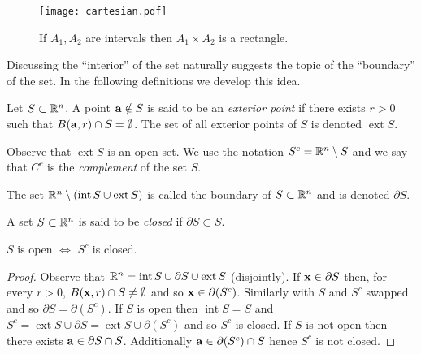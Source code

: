 \begin{figure}[htb]
    \begin{centering}
        \texttt{[image: cartesian.pdf]}
        \caption{If \(A_1, A_2\) are intervals then \( A_1 \times A_2 \) is a rectangle.}
    \end{centering}
\end{figure}

Discussing the ``interior'' of the set naturally suggests the topic of the ``boundary'' of the set.
In the following definitions we develop this idea.


\begin{definition}
    Let \(S\subset \bR^n\).
    A point \(\aa \notin S\) is said to be an \emph{exterior point} if there exists \(r>0\) such that \(B(\aa,r)\cap S = \emptyset\).
    The set of all exterior points of \(S\) is denoted \(\operatorname{ext} S\).
\end{definition}

Observe that \(\operatorname{ext} S\) is an open set.
We use the notation \(S^c = \bR^n \setminus S\) and we say that \(C^c\) is the \emph{complement} of the set \(S\).



\begin{definition}[boundary]
    The set \(\bR^n \setminus (\operatorname{int} S \cup \operatorname{ext} S )\) is called the boundary of \(S \subset \bR^n\) and is denoted \(\partial S\).
\end{definition}


\begin{definition}[closed]
    A set \(S\subset \bR^n\) is said to be \emph{closed} if \(\partial S \subset S\).
\end{definition}

\begin{lemma}
    \(S\) is open \(\Longleftrightarrow \) \(S^c\) is closed.
\end{lemma}
\begin{proof}
    Observe that \(\bR^n =  \operatorname{int} S \cup \partial S \cup \operatorname{ext} S\) (disjointly).
    If \(\xx \in \partial S\) then, for every \(r>0\), \(B(\xx,r) \cap S \neq \emptyset\) and so \(\xx \in \partial(S^c)\).
    Similarly with \(S\) and \(S^c\) swapped and so \(\partial S = \partial(S^c)\).
    If \(S\) is open then \(\operatorname{int} S = S\) and \(S^c = \operatorname{ext} S \cup \partial S =  \operatorname{ext} S \cup \partial (S^c)\) and so \(S^c\) is closed.
    If \(S\) is not open then there exists \(\aa \in \partial S \cap S\). Additionally  \(\aa \in \partial (S^c) \cap S\) hence \(S^c\) is not closed.
\end{proof}


